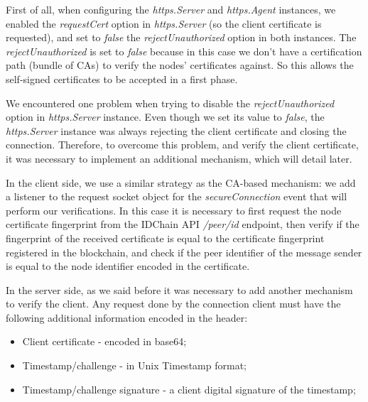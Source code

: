 

First of all, when configuring the \textit{https.Server} and \textit{https.Agent} instances, we enabled the \textit{requestCert} option in \textit{https.Server} (so the client certificate is requested), and set to \textit{false} the \textit{rejectUnauthorized} option in both instances.
The \textit{rejectUnauthorized} is set to \textit{false} because in this case we don't have a certification path (bundle of CAs) to verify the nodes' certificates against.
So this allows the self-signed certificates to be accepted in a first phase.

We encountered one problem when trying to disable the \textit{rejectUnauthorized} option in \textit{https.Server} instance.
Even though we set its value to \textit{false}, the \textit{https.Server} instance was always rejecting the client certificate and closing the connection.
Therefore, to overcome this problem, and verify the client certificate, it was necessary to implement an additional mechanism, which will detail later.

In the client side, we use a similar strategy as the CA-based mechanism: we add a listener to the request socket object for the \textit{secureConnection} event that will perform our verifications.
In this case it is necessary to first request the node certificate fingerprint from the IDChain API \textit{/peer/id} endpoint, then verify if the fingerprint of the received certificate is equal to the certificate fingerprint registered in the blockchain, and check if the peer identifier of the message sender is equal to the node identifier encoded in the certificate.

In the server side, as we said before it was necessary to add another mechanism to verify the client.
Any request done by the connection client must have the following additional information encoded in the header:

\begin{itemize}
  \item Client certificate - encoded in base64;
  \item Timestamp/challenge - in Unix Timestamp format;
  \item Timestamp/challenge signature - a client digital signature of the timestamp;
\end{itemize}

